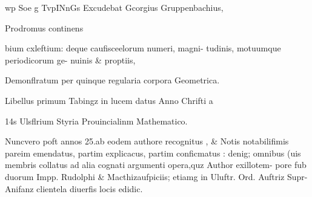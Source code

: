 \documentclass{article}
\begin{document}
wp Soe
g
TvpINnGs
Excudebat Gcorgius Gruppenbachius,

Prodromus
continens


bium cxleftium: deque caufisceelorum numeri, magni-
tudinis, motuumque periodicorum ge-
nuinis & proptiis,

Demonflratum per quinque regularia corpora Geometrica.

Libellus primum Tabingz in lucem datus Anno Chrifti
a

14s Ulsflrium Styria Prouincialinm Mathematico.

Nuncvero poft annos 25.ab eodem authore recognitus , & Notis notabilifimis
pareim emendatus, partim explicacus, partim conficmatus : denig; omnibus (uis
membris collatus ad alia cognati argumenti opera,quz Author exillotem-
pore fub duorum Impp. Rudolphi & Macthizaufpiciis; etiamg in
Uluftr. Ord. Auftriz Supr-Anifanz clientela
diuerfis locis edidic.
\end{document}
